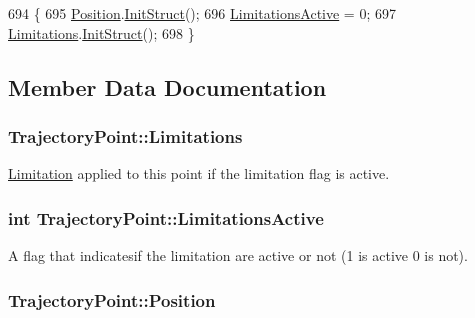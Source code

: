 \begin{DoxyCode}
694     \{
695         \hyperlink{structTrajectoryPoint_aa24430dc273e9d7968a6c44e3bcee259}{Position}.\hyperlink{structUserPosition_ad682f9be07fa2307028f86624ded2958}{InitStruct}();
696         \hyperlink{structTrajectoryPoint_acec47b76503d6f202e78bd00ec8fa02d}{LimitationsActive} = 0;
697         \hyperlink{structTrajectoryPoint_ad6d7f13b1dee1ef3a5300ffffd77cac8}{Limitations}.\hyperlink{structLimitation_a098f4ee5d0eb6baf844ff3164f1a20f6}{InitStruct}();
698     \}
\end{DoxyCode}


\subsection{Member Data Documentation}
\subsubsection[{\texorpdfstring{Limitations}{Limitations}}]{ Trajectory\+Point\+::\+Limitations}\hypertarget{structTrajectoryPoint_ad6d7f13b1dee1ef3a5300ffffd77cac8}{}\label{structTrajectoryPoint_ad6d7f13b1dee1ef3a5300ffffd77cac8}


\hyperlink{structLimitation}{Limitation} applied to this point if the limitation flag is active. 

\subsubsection[{\texorpdfstring{Limitations\+Active}{LimitationsActive}}]{\setlength{\rightskip}{0pt plus 5cm}int Trajectory\+Point\+::\+Limitations\+Active}\hypertarget{structTrajectoryPoint_acec47b76503d6f202e78bd00ec8fa02d}{}\label{structTrajectoryPoint_acec47b76503d6f202e78bd00ec8fa02d}


A flag that indicatesif the limitation are active or not (1 is active 0 is not). 

\subsubsection[{\texorpdfstring{Position}{Position}}]{ Trajectory\+Point\+::\+Position}\hypertarget{structTrajectoryPoint_aa24430dc273e9d7968a6c44e3bcee259}{}\label{structTrajectoryPoint_aa24430dc273e9d7968a6c44e3bcee259}


